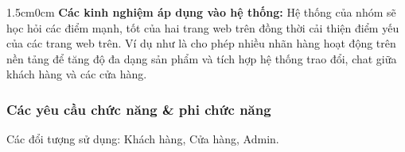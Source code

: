             \begin{adjustwidth}{1.5cm}{0cm}
                \textbf{Các kinh nghiệm áp dụng vào hệ thống: } Hệ thống của nhóm sẽ học hỏi các điểm mạnh, tốt của hai trang web trên đồng thời cải thiện điểm yếu của các trang web trên. Ví dụ như là cho phép nhiều nhãn hàng hoạt động trên nền tảng để tăng độ đa dạng sản phẩm và tích hợp hệ thống trao đổi, chat giữa khách hàng và các cửa hàng. \\
            \end{adjustwidth}
            
            \subsubsection{Các yêu cầu chức năng \& phi chức năng}
                \hspace{1.5cm} Các đổi tượng sử dụng: Khách hàng, Cửa hàng, Admin.
